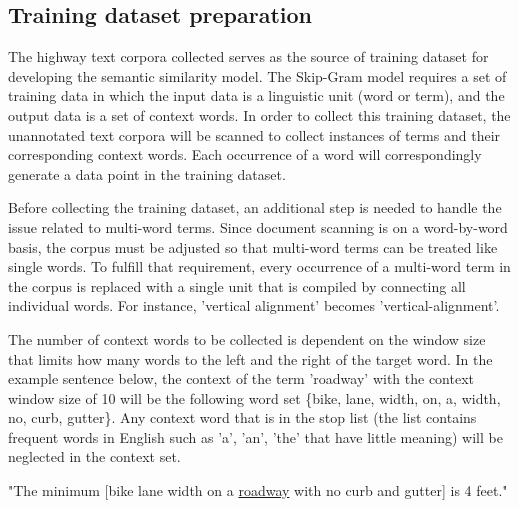 \documentclass[Journal, InsideFigs, DoubleSpace]{ascelike} %
\begin{document}
\subsection{Training dataset preparation}
The highway text corpora collected serves as the source of training dataset for developing the semantic similarity model. The Skip-Gram model requires a set of training data in which the input data is a linguistic unit (word or term), and the output data is a set of context words. In order to collect this training dataset, the unannotated text corpora will be scanned to collect instances of terms and their corresponding context words. Each occurrence of a word will correspondingly generate a data point in the training dataset.
\par
Before collecting the training dataset, an additional step is needed to handle the issue related to multi-word terms. Since document scanning is on a word-by-word basis, the corpus must be adjusted so that multi-word terms can be treated like single words. To fulfill that requirement, every occurrence of a multi-word term in the corpus is replaced with a single unit that is compiled by connecting all individual words. For instance, 'vertical alignment' becomes 'vertical-alignment'.
\par
The number of context words to be collected is dependent on the window size that limits how many words to the left and the right of the target word. In the example sentence below, the context of the term 'roadway' with the context window size of 10 will be the following word set \{bike, lane, width, on, a, width, no, curb, gutter\}. Any context word that is in the stop list (the list contains frequent words in English such as 'a', 'an', 'the' that have little meaning) will be neglected in the context set.
%
\begin{center}
	"The minimum [bike lane width on a \underline{roadway} with no curb and gutter] is 4 feet."
\end{center}
%
\end{document}
